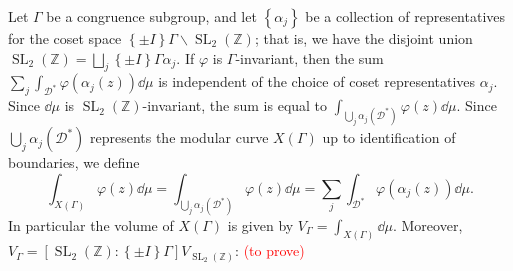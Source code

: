 \documentclass[10pt,leqno,twoside]{article}
\theoremstyle{plain}
\theoremstyle{definition}
\numberwithin{equation}{section}
\numberwithin{lem}{section}
\newcommand{\cbr}[1]{\left\{#1\right\}}
\newcommand{\textib}[1]{\textbf{\textit{#1\index{#1}}}} %
\DeclareMathOperator{\SL}{SL}
\newcommand{\slz}{\SL_2(\mathbb{Z})}
\newcommand{\tbd}{{\Huge\color{red}{\textib{TO DO}}}}
\newcommand{\sai}[1]{\textcolor{red}{#1}}
\begin{document}
Let $\varGamma$ be a congruence subgroup, and let $\cbr{\alpha_j}$ be a collection of representatives for the coset space $\cbr{\pm I}\varGamma\backslash\slz$; that is, we have the disjoint union $\slz = \bigsqcup_j \cbr{\pm I}\varGamma \alpha_j$. If $\varphi$ is $\varGamma$-invariant, then the sum $\sum_j\int_{\mathcal D^\ast}\varphi(\alpha_j(z))\dd\mu$ is independent of the choice of coset representatives $\alpha_j$. Since $\dd\mu$ is $\slz$-invariant, the sum is equal to $\int_{\bigcup_j \alpha_j(\mathcal D^\ast)}\varphi(z)\dd\mu$. Since $\bigcup_j\alpha_j(\mathcal D^\ast)$ represents the modular curve $X(\varGamma)$ up to identification of boundaries, we define 
\[\int_{X(\varGamma)}\varphi(z)\dd\mu = \int_{\bigcup_j\alpha_j(\mathcal D^\ast)}\varphi(z)\dd\mu = \sum_j\int_{\mathcal D^\ast}\varphi(\alpha_j(z))\dd\mu.\] In particular the volume of $X(\varGamma)$ is given by $V_\varGamma = \int_{X(\varGamma)}\dd\mu$. Moreover, $V_\varGamma = [\slz : \cbr{\pm I}\varGamma]V_{\slz}$: \sai{(to prove)}\tbd
\end{document}
